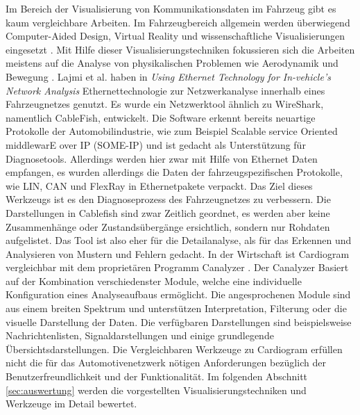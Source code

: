 \documentclass[draft=false
              ,paper=a4
              ,twoside=false
              ,fontsize=11pt
              ,headsepline
              ,BCOR10mm
              ,DIV11
              ]{scrbook}
\begin{document}
Im Bereich der Visualisierung von Kommunikationsdaten im Fahrzeug gibt es kaum vergleichbare Arbeiten. Im Fahrzeugbereich allgemein werden überwiegend Computer-Aided Design, Virtual Reality und wissenschaftliche Visualisierungen eingesetzt \cite{stevens_visualization_2007}. Mit Hilfe dieser Visualisierungstechniken fokussieren sich die Arbeiten meistens auf die Analyse von physikalischen Problemen wie Aerodynamik und Bewegung \cite{konyha_interactive_2007}\cite{schulz_interactive_1999}. Lajmi et al. haben in \textit{Using Ethernet Technology for In-vehicle’s Network Analysis}  \cite{lajmi_using_2013} Ethernettechnologie zur Netzwerkanalyse innerhalb eines Fahrzeugnetzes genutzt. Es wurde ein Netzwerktool ähnlich zu WireShark, namentlich CableFish, entwickelt. Die Software erkennt bereits neuartige Protokolle der Automobilindustrie, wie zum Beispiel Scalable service Oriented middlewarE over IP (SOME-IP) \cite{someip_scalable_2014} und ist gedacht als Unterstützung für Diagnosetools. Allerdings werden hier zwar mit Hilfe von Ethernet Daten empfangen, es wurden allerdings die Daten der fahrzeugspezifischen Protokolle, wie LIN, CAN und FlexRay in Ethernetpakete verpackt. Das Ziel dieses Werkzeugs ist es den Diagnoseprozess des Fahrzeugnetzes zu verbessern. Die Darstellungen in Cablefish sind zwar Zeitlich geordnet, es werden aber keine Zusammenhänge oder Zustandsübergänge ersichtlich, sondern nur Rohdaten aufgelistet. Das Tool ist also eher für die Detailanalyse, als für das Erkennen und Analysieren von Mustern und Fehlern gedacht. In der Wirtschaft ist Cardiogram vergleichbar mit dem proprietären Programm Canalyzer \cite{vector_2017}. Der Canalyzer Basiert auf der Kombination verschiedenster Module, welche eine individuelle Konfiguration eines Analyseaufbaus ermöglicht. Die angesprochenen Module sind aus einem breiten Spektrum und unterstützen Interpretation, Filterung oder die visuelle Darstellung der Daten. Die verfügbaren Darstellungen sind beispielsweise Nachrichtenlisten, Signaldarstellungen und einige grundlegende Übersichtsdarstellungen. 
Die Vergleichbaren Werkzeuge zu Cardiogram erfüllen nicht die für das Automotivenetzwerk nötigen Anforderungen bezüglich der Benutzerfreundlichkeit und der Funktionalität. Im folgenden Abschnitt \ref{sec:auswertung} werden die vorgestellten Visualisierungstechniken und Werkzeuge im Detail bewertet. 
\end{document}
